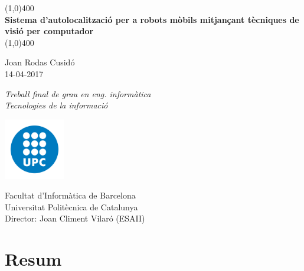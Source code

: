 \documentclass[a4paper,12pt]{report}
\begin{document}

	\begin{titlepage}
		\begin{center}
			\vspace*{1cm}

			\line(1,0){400}\\
			\vspace{0.3cm}
			\Huge
			\textbf{Sistema d'autolocalització per a robots mòbils mitjançant tècniques de visió per computador}\\
			\line(1,0){400}

			\vspace{1.0cm}
			\Large
			Joan Rodas Cusidó\\
			14-04-2017

			\vfill
			\LARGE
			\textit{Treball final de grau en eng. informàtica\\
			Tecnologies de la informació}\\

			\vspace{3cm}

			\includegraphics[width=0.2\textwidth]{images/logo}
			
			\vspace{0.5cm}

			\Large
			Facultat d'Informàtica de Barcelona\\
			Universitat Politècnica de Catalunya\\
			Director: Joan Climent Vilaró (ESAII)
		\end{center}
	\end{titlepage}

	\restoregeometry
	\setcounter{page}{2}

	\chapter*{Resum}
	
\end{document}
